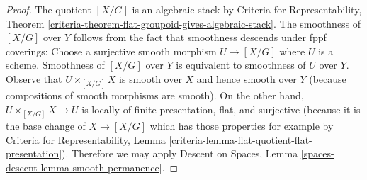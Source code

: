 \documentclass[10pt,a4paper]{amsart}
\theoremstyle{plain}
\theoremstyle{definition}
\theoremstyle{remark}
\numberwithin{equation}{subsection}
\begin{document}
\begin{proof}
The quotient $[X/G]$ is an algebraic stack by
Criteria for Representability, Theorem
\ref{criteria-theorem-flat-groupoid-gives-algebraic-stack}.
The smoothness of $[X/G]$ over $Y$ follows from the fact that smoothness
descends under fppf coverings:
Choose a surjective smooth morphism $U \to [X/G]$ where $U$ is a scheme.
Smoothness of $[X/G]$ over $Y$ is equivalent to smoothness of $U$ over $Y$.
Observe that $U \times_{[X/G]} X$ is smooth over $X$ and hence smooth
over $Y$ (because compositions of smooth morphisms are smooth).
On the other hand, $U \times_{[X/G]} X \to U$ is locally of
finite presentation, flat, and surjective (because it is
the base change of $X \to [X/G]$ which has those properties
for example by Criteria for Representability, Lemma
\ref{criteria-lemma-flat-quotient-flat-presentation}).
Therefore we may apply Descent on Spaces,
Lemma \ref{spaces-descent-lemma-smooth-permanence}.
\end{proof}
\end{document}
